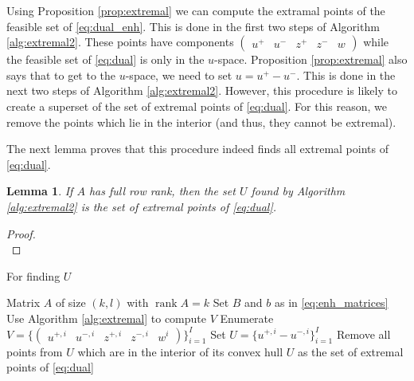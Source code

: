 \documentclass{article}
\newtheorem{lemma}[thm]{Lemma}
\theoremstyle{definition}
\newcommand{\rank}{\operatorname{rank}}
\begin{document}
Using Proposition \ref{prop:extremal} we can compute the extramal points of the feasible set of \eqref{eq:dual_enh}. This is done in the first two steps of Algorithm \ref{alg:extremal2}. These points have components $\begin{pmatrix} u^+ & u^- & z^+& z^- & w \end{pmatrix}$ while the feasible set of \eqref{eq:dual} is only in the $u$-space. Proposition \ref{prop:extremal} also says that to get to the $u$-space, we need to set $u=u^+-u^-$. This is done in the next two steps of Algorithm \ref{alg:extremal2}. However, this procedure is likely to create a superset of the set of extremal points of \eqref{eq:dual}. For this reason, we remove the points which lie in the interior (and thus, they cannot be extremal).

The next lemma proves that this procedure indeed finds all extremal points of \eqref{eq:dual}.

\begin{lemma}
  If $A$ has full row rank, then the set $U$ found by Algorithm \ref{alg:extremal2} is the set of extremal points of \eqref{eq:dual}.
\end{lemma}
\begin{proof}
\ \\
\end{proof}





\begin{algorithm}
\caption{For finding $U$}
\label{alg:extremal2}
\begin{algorithmic}[1]
  \Require Matrix $A$ of size $(k,l)$ with $\rank A=k$
  \State Set $B$ and $b$ as in \eqref{eq:enh_matrices}
  \State Use Algorithm \ref{alg:extremal} to compute $V$
  \State Enumerate $V = \{\begin{pmatrix} u^{+,i} & u^{-,i} & z^{+,i}& z^{-,i} & w^i \end{pmatrix}\}_{i=1}^I$
  \State Set $U = \{u^{+,i} - u^{-,i}\}_{i=1}^I$
  \State Remove all points from $U$ which are in the interior of its convex hull
  \Ensure $U$ as the set of extremal points of \eqref{eq:dual}
\end{algorithmic}
\end{algorithm}
\end{document}
